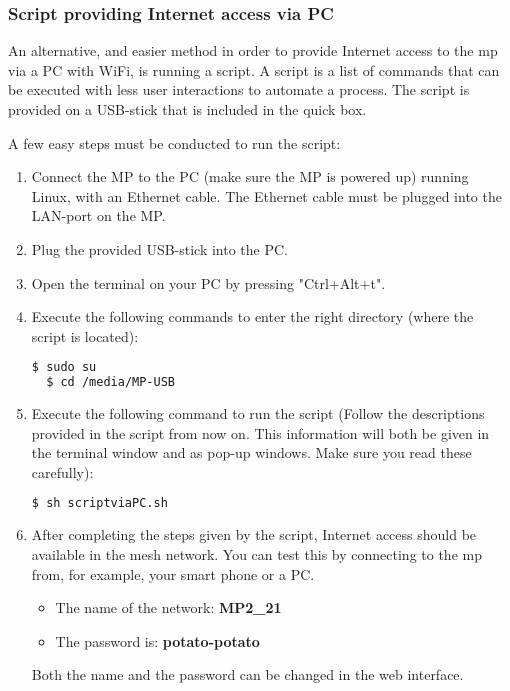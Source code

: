 \subsubsection{Script providing Internet access via PC}

An alternative, and easier method in order to provide Internet access to the \gls{mp} via a PC with WiFi, is running a script. A script is a list of commands that can be executed with less user interactions to automate a process. The script is provided on a USB-stick that is included in the \gls{quick} box. 

A few easy steps must be conducted to run the script:
\begin{enumerate}
\item Connect the MP to the PC (make sure the MP is powered up) running Linux, with an Ethernet cable. The Ethernet cable must be plugged into the LAN-port on the MP.
\item Plug the provided USB-stick into the PC.  
\item Open the terminal on your PC by pressing "Ctrl+Alt+t". 
\item Execute the following commands to enter the right directory (where the script is located):
\noindent
\begin{lstlisting}[language=bash]
  $ sudo su
  $ cd /media/MP-USB
\end{lstlisting}
\item Execute the following command to run the script (Follow the descriptions provided in the script from now on. This information will both be given in the terminal window and as pop-up windows. Make sure you read these carefully):
\noindent
\begin{lstlisting}[language=bash]
  $ sh scriptviaPC.sh
\end{lstlisting}
\item After completing the steps given by the script, Internet access should be available in the mesh network. You can test this by connecting to the \gls{mp} from, for example, your smart phone or a PC. 
\begin{itemize}
\item The name of the network: \textbf{MP2_21}
\item The password is: \textbf{potato-potato}
\end{itemize}
Both the name and the password can be changed in the web interface. 
\end{enumerate}